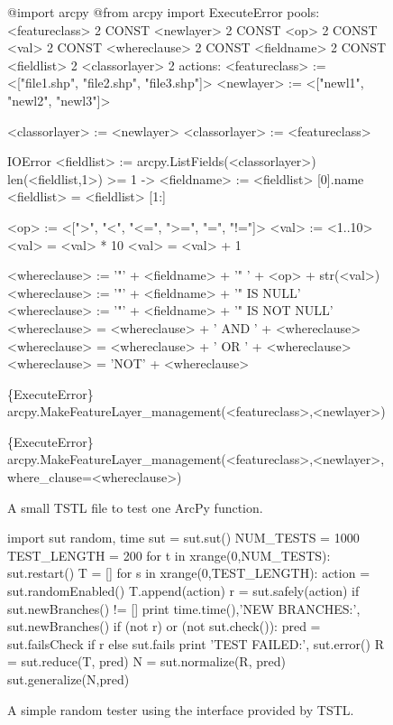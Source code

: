 \begin{figure}
{\scriptsize
\begin{code}
@import arcpy
@from arcpy import ExecuteError
\vspace{0.1in}
pools:
  <featureclass> 2 CONST
  <newlayer> 2 CONST
  <op> 2 CONST 
  <val> 2 CONST
  <whereclause> 2 CONST
  <fieldname> 2 CONST
  <fieldlist> 2
  <classorlayer> 2
\vspace{0.1in}
actions:
\vspace{0.1in}
<featureclass> := <["file1.shp", "file2.shp", "file3.shp"]>
<newlayer> := <["newl1", "newl2", "newl3"]>

<classorlayer> := <newlayer>
<classorlayer> := <featureclass>

{IOError} <fieldlist> := arcpy.ListFields(<classorlayer>)
len(<fieldlist,1>) >= 1 -> <fieldname> := <fieldlist> [0].name 
<fieldlist> = <fieldlist> [1:]

<op> := <[">", "<", "<=", ">=", "=", "!="]>
<val> := <1..10>
<val> = <val> * 10
<val> = <val> + 1

<whereclause> := '"' + <fieldname> + '" ' + <op> + str(<val>)
<whereclause> := '"' + <fieldname> + '" IS NULL'
<whereclause> := '"' + <fieldname> + '" IS NOT NULL'
<whereclause> = <whereclause> + ' AND ' + <whereclause>
<whereclause> = <whereclause> + ' OR ' +  <whereclause>
<whereclause> = 'NOT' + <whereclause>

\{ExecuteError\} arcpy.MakeFeatureLayer\_management(<featureclass>,<newlayer>)

\{ExecuteError\} arcpy.MakeFeatureLayer\_management(<featureclass>,<newlayer>,
  where\_clause=<whereclause>)
\end{code}
}
\caption{A small TSTL file to test one ArcPy function.}
\label{fig:makefeaturelayer}
\end{figure}

\begin{figure}
{\scriptsize
\begin{code}
import sut random, time
sut = sut.sut()
NUM\_TESTS = 1000
TEST\_LENGTH = 200 
for t in xrange(0,NUM\_TESTS):
   sut.restart()
   T = []
   for s in xrange(0,TEST\_LENGTH): 
       action = sut.randomEnabled()
       T.append(action)
       r = sut.safely(action)
       if sut.newBranches() != []
          print time.time(),'NEW BRANCHES:', sut.newBranches()
       if (not r) or (not sut.check()):
          pred = sut.failsCheck if r else sut.fails
          print 'TEST FAILED:', sut.error() 
          R = sut.reduce(T, pred)
          N = sut.normalize(R, pred) 
          sut.generalize(N,pred)
\end{code}
}
\caption{A simple random tester using the interface provided by TSTL.}
\label{fig:rt}
\end{figure}

